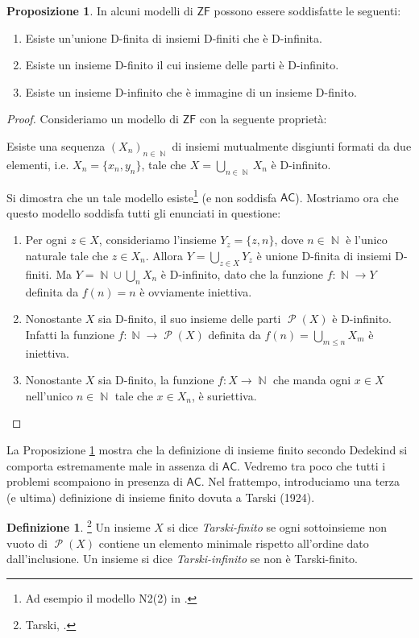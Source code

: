 \documentclass[12pt,a4paper]{report}
\theoremstyle{definition}
\newtheorem{defn}[teo]{Definizione}  %
\newtheorem{prop}[teo]{Proposizione}  %
\theoremstyle{num.custom-title}
\DeclareMathOperator{\PP}{\mathcal{P}}
\DeclareMathOperator{\N}{\mathbb{N}}
\newcommand{\AC}{\ensuremath{\mathsf{AC}}\xspace}
\newcommand{\ZF}{\ensuremath{\mathsf{ZF}}\xspace}
\begin{document}
\begin{prop}\label{d-fin_bugs}
In alcuni modelli di \ZF possono essere soddisfatte le seguenti:
\begin{enumerate}
\item Esiste un'unione D-finita di insiemi D-finiti che è D-infinita.
\item Esiste un insieme D-finito il cui insieme delle parti è D-infinito.
\item Esiste un insieme D-infinito che è immagine di un insieme D-finito.
\end{enumerate}
\begin{proof}
Consideriamo un modello di \ZF con la seguente proprietà:
\begin{center}
Esiste una sequenza $(X_n)_{n \in \N}$ di insiemi mutualmente disgiunti formati da due elementi, i.e. $X_n=\{x_n,y_n\}$, tale che $X=\bigcup_{n \in \N} X_n$ è D-infinito.
\end{center}
Si dimostra che un tale modello esiste\footnote{Ad esempio il modello N2(2) in \cite{HoRu98:Herrlich}.} (e non soddisfa \AC). Mostriamo ora che questo modello soddisfa tutti gli enunciati in questione:
\begin{enumerate}
\item Per ogni $z \in X$, consideriamo l'insieme $Y_z = \{z,n\}$, dove $n \in \N$ è l'unico naturale tale che $z \in X_n$. Allora $Y= \bigcup_{z \in X} Y_z$ è unione D-finita di insiemi D-finiti. Ma $Y = \N \cup \bigcup_n X_n$ è D-infinito, dato che la funzione $f: \N \to Y$ definita da $f(n)=n$ è ovviamente iniettiva.
\item Nonostante $X$ sia D-finito, il suo insieme delle parti $\PP(X)$ è D-infinito. Infatti la funzione $f: \N \to \PP(X)$ definita da $f(n) = \displaystyle\bigcup_{m \leq n} X_m$ è iniettiva.
\item Nonostante $X$ sia D-finito, la funzione $f: X \to \N$ che manda ogni $x \in X$ nell'unico $n \in \N$ tale che $x \in X_n$, è suriettiva.
\end{enumerate}
\end{proof}
\end{prop}

La Proposizione \ref{d-fin_bugs} mostra che la definizione di insieme finito secondo Dedekind si comporta estremamente male in assenza di \AC. Vedremo tra poco che tutti i problemi scompaiono in presenza di \AC. Nel frattempo, introduciamo una terza (e ultima) definizione di insieme finito dovuta a Tarski (1924).

\begin{defn}\footnote{Tarski, \cite{Tar24a:Herrlich}.}
Un insieme $X$ si dice \emph{Tarski-finito} se ogni sottoinsieme non vuoto di $\PP(X)$ contiene un elemento minimale rispetto all'ordine dato dall'inclusione. Un insieme si dice \emph{Tarski-infinito} se non è Tarski-finito.
\end{defn}
\end{document}
